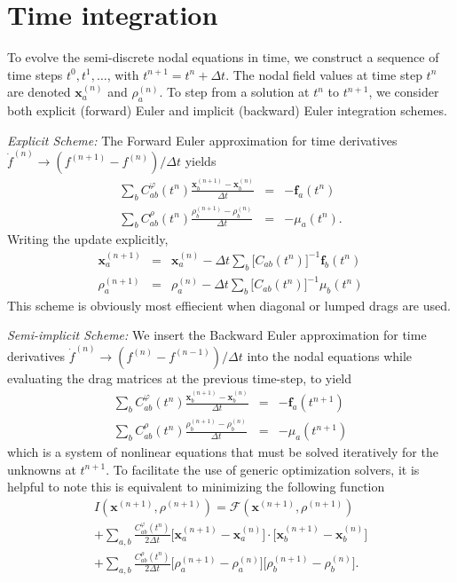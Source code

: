 \documentclass[
pre,
 twocolumn,
amsmath,
amssymb
]{revtex4}
\begin{document}
\section{Time integration}\label{sec:time} %
To evolve the semi-discrete nodal equations in time, we construct a sequence of time steps $t^0, t^1, \dots$, with $t^{n+1}=t^n+\Delta t$.  The nodal field values at time step $t^n$ are denoted $\bm{x}_a^{(n)}$ and $\rho_a^{(n)}$.  To step from a solution at $t^n$ to $t^{n+1}$, we consider both explicit (forward) Euler and implicit (backward) Euler integration schemes.
 
\textit{Explicit Scheme:} The Forward Euler approximation for time derivatives $ \dot{f}^{(n)} \to (f^{(n+1)}-f^{(n)})/\Delta t$
yields
\begin{eqnarray*}
\sum_{b}C_{ab}^{\varphi}(t^{n})\frac{\bm{x}_b^{(n+1)}-\bm{x}_b^{(n)}}{\Delta t} &=& -\bm{f}_a(t^{n}) \\
\sum_{b}C_{ab}^{\rho}(t^{n})\frac{\rho_b^{(n+1)}-\rho_b^{(n)}}{\Delta t} &=& -\mu_a(t^{n})  .
\end{eqnarray*}
%
Writing the update explicitly,
\begin{eqnarray*}
\bm{x}_a^{(n+1)}&=&\bm{x}_a^{(n)} -\Delta t \sum_{b}\big[C_{ab}(t^{n}) \big]^{-1}\bm{f}_b(t^n) \\
\rho_a^{(n+1)}&=&\rho_a^{(n)} - \Delta t \sum_{b}\big[C_{ab}(t^{n}) \big]^{-1}\mu_b(t^n)  
\end{eqnarray*}
This scheme is obviously most effiecient when diagonal or lumped drags are used.

\textit{Semi-implicit Scheme:}  We insert the  Backward Euler approximation for time derivatives $ \dot{f}^{(n)} \to (f^{(n)}-f^{(n-1)})/\Delta t$ into the nodal equations while evaluating the drag matrices at the previous time-step, to yield
\begin{eqnarray*}
\sum_{b}C_{ab}^{\varphi}(t^{n})\frac{\bm{x}_b^{(n+1)}-\bm{x}_b^{(n)}}{\Delta t} &=& -\bm{f}_a(t^{n+1})  \\
\sum_{b}C_{ab}^{\rho}(t^{n})\frac{\rho_b^{(n+1)}-\rho_b^{(n)}}{\Delta t} &=& -\mu_a(t^{n+1})  
\end{eqnarray*}
%
which is a system of nonlinear equations that must be solved iteratively for the unknowns at $t^{n+1}$.  To facilitate the use of generic optimization solvers, it is helpful to note this is equivalent to minimizing the following function
\begin{multline*}
I(\bm{x}^{(n+1)},\rho^{(n+1)}) = \mathcal{F}(\bm{x}^{(n+1)},\rho^{(n+1)}) \\ 
+ \sum_{a,b}\frac{ C^\varphi_{ab}(t^{n})}{2\Delta t}\big[\bm{x}_a^{(n+1)}-\bm{x}_a^{(n)}\big]\cdot\big[\bm{x}_b^{(n+1)}-\bm{x}_b^{(n)}\big] \\
+ \sum_{a,b}\frac{ C^\rho_{ab}(t^{n})}{2\Delta t}\big[\rho_a^{(n+1)}-\rho_a^{(n)}\big]\big[\rho_b^{(n+1)}-\rho_b^{(n)}\big] .
\end{multline*}
\newpage
\appendix
\end{document}
